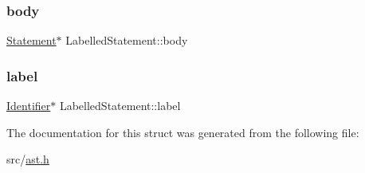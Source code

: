 \subsubsection{\texorpdfstring{body}{body}}
{\footnotesize\ttfamily \hyperlink{struct_statement}{Statement}$\ast$ Labelled\+Statement\+::body}

\mbox{\label{struct_labelled_statement_aa3cb4a075ce2d599c8e1eca7700100b7}} 
\subsubsection{\texorpdfstring{label}{label}}
{\footnotesize\ttfamily \hyperlink{struct_identifier}{Identifier}$\ast$ Labelled\+Statement\+::label}



The documentation for this struct was generated from the following file\+:\begin{DoxyCompactItemize}
\item 
src/\hyperlink{ast_8h}{ast.\+h}\end{DoxyCompactItemize}
